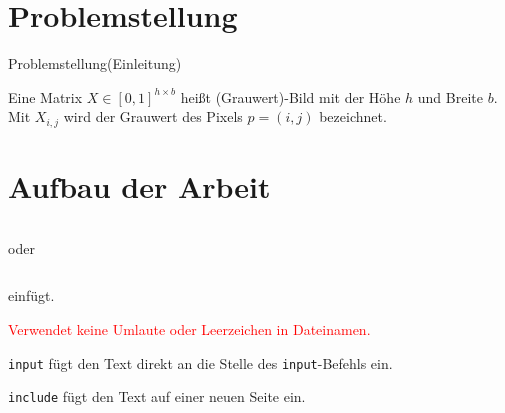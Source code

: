 \section*{Problemstellung}
Problemstellung(Einleitung)

\begin{defi}
    \label{def:image}
    Eine Matrix $X \in [0,1]^{h \times b}$ heißt (Grauwert)-Bild mit der Höhe $h$ und Breite $b$. Mit $X_{i,j}$ wird der Grauwert des Pixels $p=(i,j)$ bezeichnet.
\end{defi}
\section*{Aufbau der Arbeit}
\begin{verbatim}\end{verbatim}

\bigskip
oder

\bigskip
\begin{verbatim}\end{verbatim}
einfügt.

\bigskip
\noindent\textcolor{red}{Verwendet keine Umlaute oder Leerzeichen in Dateinamen.}

\noindent\texttt{input} fügt den Text direkt an die Stelle des \texttt{input}-Befehls ein.

\noindent\texttt{include} fügt den Text auf einer neuen Seite ein. 
